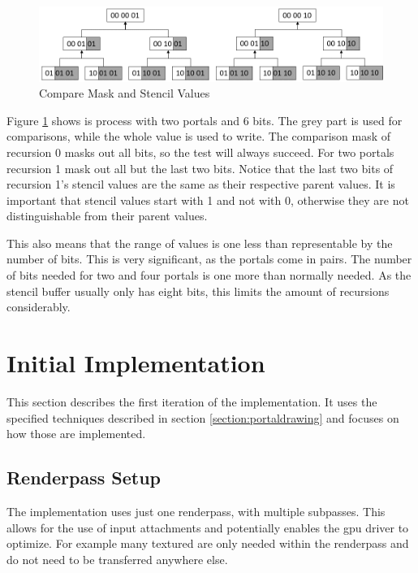 \begin{figure}[h]
	\includegraphics[width=\linewidth]{images/stencilvalues2.png}
	\caption{Compare Mask and Stencil Values}
	\label{fig:stencilvalues}
\end{figure}

Figure \ref{fig:stencilvalues} shows is process with two portals and 6 bits. The grey part is used for comparisons, while the whole value is used to write. The comparison mask of recursion 0 masks out all bits, so the test will always succeed. For two portals recursion 1 mask out all but the last two bits. Notice that the last two bits of  recursion 1's stencil values are the same as their respective parent values. It is important that stencil values start with 1 and not with 0, otherwise they are not distinguishable from their parent values.

This also means that the range of values is one less than representable by the number of bits. This is very significant, as the portals come in pairs. The number of bits needed for two and four portals is one more than normally needed. As the stencil buffer usually only has eight bits, this limits the amount of recursions considerably.



\section{Initial Implementation}
\label{section:intialimplementation}
This section describes the first iteration of the implementation. It uses the specified techniques described in section \ref{section:portaldrawing} and focuses on how those are implemented.


\subsection{Renderpass Setup}
\label{section:renderpasssetup}

The implementation uses just one renderpass, with multiple subpasses. This allows for the use of input attachments and potentially enables the \gls{gpu} driver to optimize. For example many textured are only needed within the renderpass and do not need to be transferred anywhere else.

